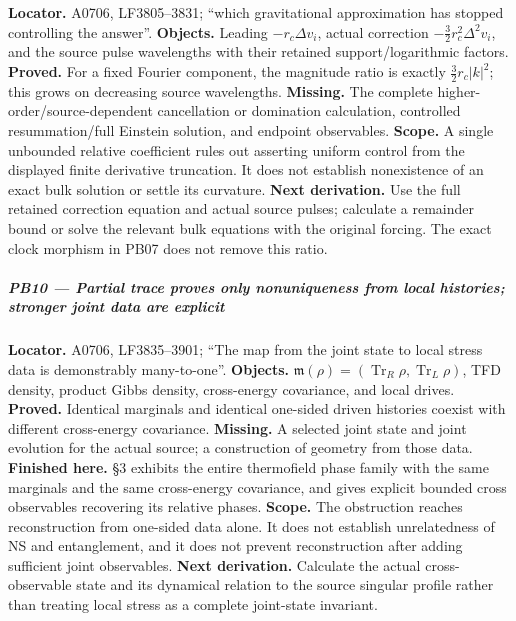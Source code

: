 \textbf{Locator.} A0706, LF3805--3831; ``which gravitational
approximation has stopped controlling the answer''. \textbf{Objects.}
Leading \(-r_c\Delta v_i\), actual correction
\(-\tfrac32r_c^2\Delta^2v_i\), and the source pulse wavelengths with
their retained support/logarithmic factors. \textbf{Proved.} For a fixed
Fourier component, the magnitude ratio is exactly \(\tfrac32r_c|k|^2\);
this grows on decreasing source wavelengths. \textbf{Missing.} The
complete higher-order/source-dependent cancellation or domination
calculation, controlled resummation/full Einstein solution, and endpoint
observables. \textbf{Scope.} A single unbounded relative coefficient
rules out asserting uniform control from the displayed finite derivative
truncation. It does not establish nonexistence of an exact bulk solution
or settle its curvature. \textbf{Next derivation.} Use the full retained
correction equation and actual source pulses; calculate a remainder
bound or solve the relevant bulk equations with the original forcing.
The exact clock morphism in PB07 does not remove this ratio.

\subparagraph{PB10 --- Partial trace proves only nonuniqueness from
local histories; stronger joint data are
explicit}\label{pb10-partial-trace-proves-only-nonuniqueness-from-local-histories-stronger-joint-data-are-explicit}

\textbf{Locator.} A0706, LF3835--3901; ``The map from the joint state to
local stress data is demonstrably many-to-one''. \textbf{Objects.}
\(\mathfrak m(\rho)=(\operatorname{Tr}_R\rho,\operatorname{Tr}_L\rho)\),
TFD density, product Gibbs density, cross-energy covariance, and local
drives. \textbf{Proved.} Identical marginals and identical one-sided
driven histories coexist with different cross-energy covariance.
\textbf{Missing.} A selected joint state and joint evolution for the
actual source; a construction of geometry from those data.
\textbf{Finished here.} \protect{} §3 exhibits the
entire thermofield phase family with the same marginals and the same
cross-energy covariance, and gives explicit bounded cross observables
recovering its relative phases. \textbf{Scope.} The obstruction reaches
reconstruction from one-sided data alone. It does not establish
unrelatedness of NS and entanglement, and it does not prevent
reconstruction after adding sufficient joint observables. \textbf{Next
derivation.} Calculate the actual cross-observable state and its
dynamical relation to the source singular profile rather than treating
local stress as a complete joint-state invariant.

